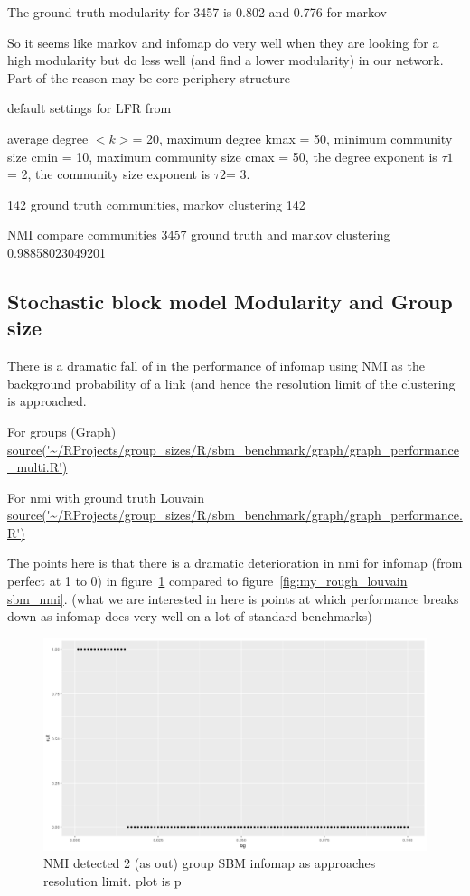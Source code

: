 The ground truth modularity for 3457 is 0.802 and 0.776 for markov

So it seems like markov and infomap do very well when they are looking for a high modularity but do less well (and find a lower modularity) in our network. Part of the reason may be core periphery structure


default settings for LFR from  \cite{lancichinetti2012consensus}

average degree $<k>$= 20, maximum degree kmax = 50, minimum community size cmin = 10, maximum community size cmax = 50, the degree exponent is $\tau1$ = 2, the community size exponent is $\tau2$= 3. 

142 ground truth communities, markov clustering 142

NMI compare communities 3457 ground truth and markov clustering 0.98858023049201

\subsection{Stochastic block model Modularity and Group size}

There is a dramatic fall of in the performance of infomap using NMI as the background probability of a link (and hence the resolution limit of the clustering is approached.

For groups (Graph)  \url{source('~/RProjects/group_sizes/R/sbm_benchmark/graph/graph_performance_multi.R')}

For nmi with ground truth Louvain
\url{source('~/RProjects/group_sizes/R/sbm_benchmark/graph/graph_performance.R')}

The points here is that there is a dramatic deterioration in nmi for infomap (from perfect at 1 to 0) in figure~\ref{fig:my_rough_infomap} compared to figure~\ref{fig:my_rough_louvain sbm_nmi}. (what we are interested in here is points at which performance breaks down as infomap does very well on a lot of standard benchmarks)


\begin{figure}
    \centering
    \includegraphics[width=\textwidth]{images/Rplot_rough_infomap_nmi_sbm.png}
    \caption{NMI detected 2 (as out) group SBM infomap as approaches resolution limit. plot is p}
    \label{fig:my_rough_infomap}
\end{figure}

